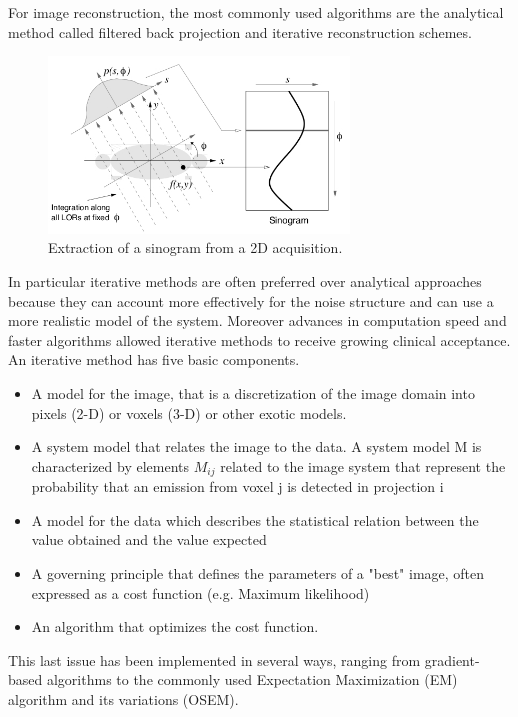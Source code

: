 For image reconstruction, the most commonly used algorithms are the analytical method called filtered back projection and iterative reconstruction schemes.
\begin{figure} 
\centering 
\includegraphics[width=8cm]{Pictures/Chapter_1/proj_sin.jpg}
\caption[Image reconstruction in PET]{Extraction of a sinogram from a 2D acquisition.}
\label{fig:reco}
\end{figure}
In particular iterative methods are often preferred over analytical approaches because they can account more effectively for the noise structure and can use a more realistic model of the system. Moreover advances in computation speed and faster algorithms allowed iterative methods to receive growing clinical acceptance.
An iterative method has five basic components.
\begin{itemize}
\item A model for the image, that is a discretization of the image domain into pixels (2-D) or voxels (3-D) or other exotic models.
\item A system model that relates the image to the data. A system model M is characterized by elements $M_{ij}$ related to the image system that represent the probability that an emission from voxel j is detected in projection i
\item A model for the data which describes the statistical relation between the value obtained and the value expected
\item A governing principle that defines the parameters of a "best" image, often expressed as a cost function (e.g. Maximum likelihood)
\item An algorithm that optimizes the cost function.
\end{itemize}

This last issue has been implemented in several ways, ranging from gradient-based algorithms to the commonly used Expectation Maximization (EM) algorithm and its variations (OSEM).


